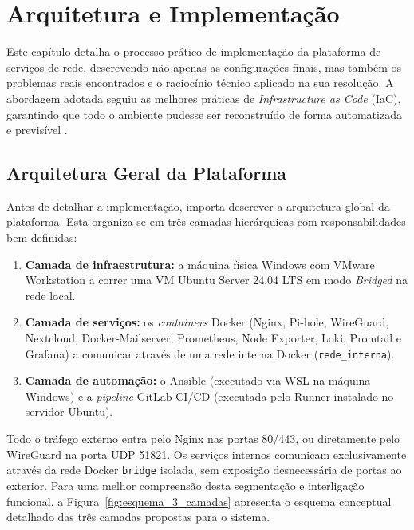 \chapter{Arquitetura e Implementação}
\label{chap:implementacao}
 
Este capítulo detalha o processo prático de implementação da plataforma de serviços de rede, descrevendo não apenas as configurações finais, mas também os problemas reais encontrados e o raciocínio técnico aplicado na sua resolução. A abordagem adotada seguiu as melhores práticas de \textit{Infrastructure as Code} (IaC), garantindo que todo o ambiente pudesse ser reconstruído de forma automatizada e previsível \cite{morris2016infrastructure}.
 
\section{Arquitetura Geral da Plataforma}
 
Antes de detalhar a implementação, importa descrever a arquitetura global da plataforma. Esta organiza-se em três camadas hierárquicas com responsabilidades bem definidas:
 
\begin{enumerate}
    \item \textbf{Camada de infraestrutura:} a máquina física Windows com VMware Workstation a correr uma VM Ubuntu Server 24.04 LTS em modo \textit{Bridged} na rede local.
    \item \textbf{Camada de serviços:} os \textit{containers} Docker (Nginx, Pi-hole, WireGuard, Nextcloud, Docker-Mailserver, Prometheus, Node Exporter, Loki, Promtail e Grafana) a comunicar através de uma rede interna Docker (\texttt{rede\_interna}).
    \item \textbf{Camada de automação:} o Ansible (executado via WSL na máquina Windows) e a \textit{pipeline} GitLab CI/CD (executada pelo Runner instalado no servidor Ubuntu).
\end{enumerate}
 
Todo o tráfego externo entra pelo Nginx nas portas 80/443, ou diretamente pelo WireGuard na porta UDP 51821. Os serviços internos comunicam exclusivamente através da rede Docker \texttt{bridge} isolada, sem exposição desnecessária de portas ao exterior. Para uma melhor compreensão desta segmentação e interligação funcional, a Figura~\ref{fig:esquema_3_camadas} apresenta o esquema conceptual detalhado das três camadas propostas para o sistema.


